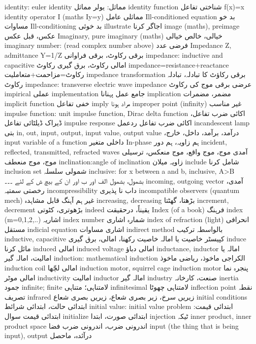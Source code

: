 identity: euler identity	مماثل: یولر مماثل
identity function	شناختی تفاعل  f(x)=x
identity operator I (maths  Iy=y)	مماثلی عامل
Ill-conditioned equation	بد خو مساوات
Ill-conditioning	بد خوئی
illustrate	اجاگر کرنا
image (maths), preimage	عکس، قبل عکس
Imaginary, pure imaginary (maths)	خیالی، خالص خیالی
imaginary number: (read complex number above)	فرضی عدد
Impedance Z, admittance Y=1/Z	برقی رکاوٹ، برقی فراوانی
impedance: inductive and capacitive	امالی رکاوٹ، برق گیری رکاوٹ
impedance=resistance+reactance	رکاوٹ=مزاحمت+متعاملیت
impedance transformation	برقی رکاؤٹ کا تبادلہ، تبادلہ رکاوٹ
impedance: transverse electric wave impedance	عرضی برقی موج کی رکاوٹ
impirical	عملی
implementation	جامع عمل پہنانا
implication	مضمر، مضمرات
implicit function	خفی تفاعل
imply	مراد ہونا
improper point (infinity)	غیر مناسب
impulse function: unit impulse function, Dirac delta function	اکائی ضرب تفاعل، ڈیراک ڈیلٹائی تفاعل
impulse response	اکائی ضرب تفاعل ردعمل
incandescent lamp	بتی
in, out, input, output, input value, output value	،درآمد، برآمد، داخل، خارج
input variable of a function	داخلی متغیر
In-phase	ہم زاویہ، ہم دور
incident, reflected, transmitted, refracted waves	آمدی موج، موج واقع، موج منعکس، ترسیلی موج، موج منعطف
inclination:angle of inclination	زاویہ میلان
include	شامل کرنا
inclusion set	شمولی سلسلہ
inclusive: for x between a and b, inclusive, A>B	بشمول، بشمول الف اور ب اور ان کے بیچ ش کے لئے ۔۔۔
incoming, outgoing vector	آمدی، رخصتی سمتیہ
incompressibility	داب نا پذیری
incompatible observers (quantum mech)	غیر ہم آہنگ قابل مشاہدہ
increasing, decreasing	بڑھتا، گھٹتا
increment, decrement	بڑھوتری، کٹوتی
indeed	یقیناً، درحقیقت
Index (of a book)	فرہنگ
index (m=0,1,2,..)	اشاریہ
index number	شمارہ اشاری
index of refraction (light)	انحرافی مستقل
indicial equation	اشاری مساوات
indirect method	بالواسطہ ترکیب
inductive, capacitive	کپیسٹر خاصیت یا امالہ خاصیت رکھنا، امالی، برق گیری
induce	مائل کرنا
induced	امالی
induced voltage	امالی دباؤ
inductance, inductor	امالہ یا امالیت، امالہ گیر
induction: mathematical induction	الکراجی ماخوذ، ریاضی ماخوذ
induction coil	امالی لچّھا
induction motor, squirrel cage induction motor	پنجرہ نما امالی موٹر
inductivity	امالیت
inductor	امالہ گیر
industry	صنعت، کارخانہ
inertia	جمود
infinite; finite	لامتناہی؛ متناہی
infinitesimal	لامتناہی چھوٹا
inflection point	نقطہ تصریف
infrared	زیریں سرخ، زیر بصری شعاع، زیریں بصری شعاع
initial conditions	ابتدائی حالت، ابتدائی شرائط
initial value: initial value problem	ابتدائی قیمت: ابتدائی قیمت سوال
initialize	ابتدائی صورت، ابتدا
injection	ٹیکہ
inner product, inner product space	اندرونی ضرب، اندرونی ضرب فضا
input (the thing that is being input), output	درآئدہ، ماحصل
